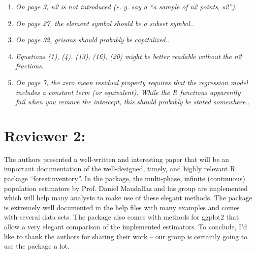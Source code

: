 \documentclass{article}
\begin{document}
\begin{enumerate}
	
	\item \textit{On page 3, n2 is not introduced (e. g. say a “a sample of n2 points, s2”)}.
	
	
	\item \textit{On page 27, the element symbol should be a subset symbol.}.
	
	
	\item \textit{On page 32, grisons should probably be capitalized.}.
	
	\answerfin{}
	
	\item \textit{Equations (1), (4), (13), (16), (20) might be better readable without the n2 fractions}.
	
	\answerfin{}
	
	\item \textit{On page 7, the zero mean residual property requires that the regression model includes a constant term (or equivalent). While the R functions apparently fail when you remove the intercept, this should probably be stated somewhere.}.
	
	\answerfin{}
	
\end{enumerate} 



\section*{Reviewer 2:}

The authors presented a well-written and interesting paper that will be an important documentation of the well-designed, timely, and highly relevant R package “forestinventory”. In the package, the multi-phase, infinite
(continuous) population estimators by Prof. Daniel Mandallaz and his group are implemented which will help many analysts to make use of these elegant methods. The package is extremely well documented in the help files with many examples and comes with several data sets. The package also comes with methods for ggplot2 that allow a very elegant comparison of the implemented estimators. To conclude, I’d like to thank the authors for sharing their work -- our group is certainly going to use the package a lot.\\
\end{document}
